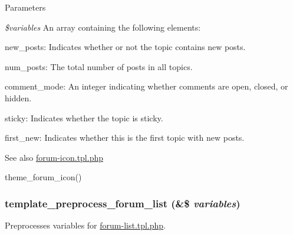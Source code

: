 \begin{DoxyParams}{Parameters}
\item[{\em \$variables}]An array containing the following elements:
\begin{DoxyItemize}
\item new\_\-posts: Indicates whether or not the topic contains new posts.
\item num\_\-posts: The total number of posts in all topics.
\item comment\_\-mode: An integer indicating whether comments are open, closed, or hidden.
\item sticky: Indicates whether the topic is sticky.
\item first\_\-new: Indicates whether this is the first topic with new posts.
\end{DoxyItemize}\end{DoxyParams}
\begin{DoxySeeAlso}{See also}
\hyperlink{forum-icon_8tpl_8php}{forum-\/icon.tpl.php} 

theme\_\-forum\_\-icon() 
\end{DoxySeeAlso}
\hypertarget{forum_8module_ad3b69c5d2f0cbf90157149bf0c8f21a5}{
\subsubsection[{template\_\-preprocess\_\-forum\_\-list}]{\setlength{\rightskip}{0pt plus 5cm}template\_\-preprocess\_\-forum\_\-list (\&\$ {\em variables})}}
\label{forum_8module_ad3b69c5d2f0cbf90157149bf0c8f21a5}
Preprocesses variables for \hyperlink{forum-list_8tpl_8php}{forum-\/list.tpl.php}.


